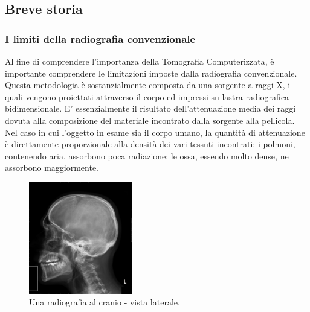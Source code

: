 \documentclass[a4paper,11pt, oneside]{article}
\begin{document}

            
            \subsection{Breve storia}
                \subsubsection{I limiti della radiografia convenzionale}
                    \par
                        Al fine di comprendere l'importanza della Tomografia Computerizzata, è importante comprendere le limitazioni imposte dalla radiografia convenzionale. Questa metodologia è sostanzialmente composta da una sorgente a raggi X, i quali vengono proiettati attraverso il corpo ed impressi su lastra radiografica bidimensionale. E’ essenzialmente il risultato dell’attenuazione media\cite{hounsfield-nobel-lecture} dei raggi dovuta alla composizione del materiale incontrato dalla sorgente alla pellicola. Nel caso in cui l’oggetto in esame sia il corpo umano, la quantità di attenuazione è direttamente proporzionale alla densità dei vari tessuti incontrati: i polmoni, contenendo aria, assorbono poca radiazione; le ossa, essendo molto dense, ne assorbono maggiormente.
                        
                        \begin{figure}[h]
                            \centering
                            \includegraphics[width=0.4\textwidth]{radiografia}
                            \caption{Una radiografia al cranio - vista laterale.}
                            \label{fig:skull}
                        \end{figure}
                    
\end{document}
